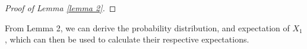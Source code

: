 \documentclass[12pt,reqno, a4]{amsart}
\begin{document}
\begin{proof}[Proof of Lemma \ref{lemma 2}]
\end{proof}
From Lemma 2, we can derive the probability distribution, and expectation of $X_1$, which can then be used to calculate their respective expectations.
\end{document}
